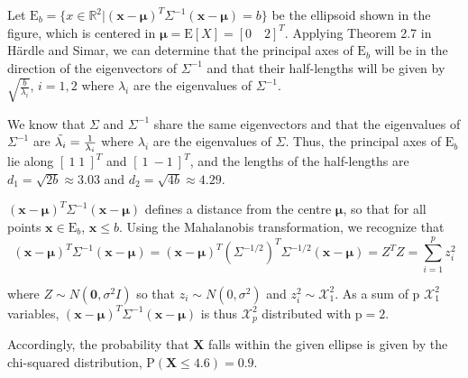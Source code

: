 Let $\text{E}_b = \{ x \in \mathbb{R}^2 | (\mathbf{x} - \mathbf{\mu})^T \Sigma^{-1}(\mathbf{x} - \mathbf{\mu}) = b \}$ be the ellipsoid shown in the figure, which is centered in $\mathbf{\mu} = \text{E}[X] = [0 \quad 2]^T$. Applying Theorem 2.7 in Härdle and Simar, we can determine that the principal axes of $\text{E}_b$ will be in the direction of the eigenvectors of $\Sigma^{-1}$ and that their half-lengths will be given by $\sqrt{\frac{b}{\lambda_i}}$, $i =1,2$ where $\lambda_i$ are the eigenvalues of $\Sigma^{-1}$.

We know that $\Sigma$ and $\Sigma^{-1}$ share the same eigenvectors and that the eigenvalues of $\Sigma^{-1}$ are  $\Tilde{\lambda_i}= \frac{1}{{\lambda_i}}$ where $\lambda_i$ are the eigenvalues of $\Sigma$. 
Thus, the principal axes of $\text{E}_b$ lie along $[\: 1 \;  1\: ]^T$ and $[\: 1 \ -1\:]^T$, and the lengths of the half-lengths are $d_1 = \sqrt{2b} \approx 3.03$ and $d_2 =  \sqrt{4b} \approx 4.29$.


$(\mathbf{x}- \mathbf{\mu})^T\Sigma^{-1} (\mathbf{x}- \mathbf{\mu})$ defines a distance from the centre $\mathbf{\mu}$, so that for all points $\mathbf{x} \in \text{E}_b$, $\mathbf{x} \leq b$. 
Using the Mahalanobis transformation, we recognize that 
\begin{equation*}
    (\mathbf{x}- \mathbf{\mu})^T\Sigma^{-1} (\mathbf{x}- \mathbf{\mu})
    = (\mathbf{x}- \mathbf{\mu})^T(\Sigma^{-1/2})^T\Sigma^{-1/2}(\mathbf{x}- \mathbf{\mu}) = Z^TZ = \sum_{i=1}^p z_i^2
\end{equation*}

where $Z \sim N(\mathbf{0}, \sigma^2 I)$ so that $z_i \sim N(0,\sigma^2)$ and $z_i^2 \sim \mathcal{X}_1^2$. As a sum of p $\mathcal{X}_1^2$ variables, $(\mathbf{x}- \mathbf{\mu})^T\Sigma^{-1} (\mathbf{x}- \mathbf{\mu})$ is thus $\mathcal{X}_p^2$ distributed with $\text{p}=2$. %

Accordingly, the probability that $\mathbf{X}$ falls within the given ellipse is given by the chi-squared distribution, $\text{P}(\mathbf{X} \leq 4.6) = 0.9$.